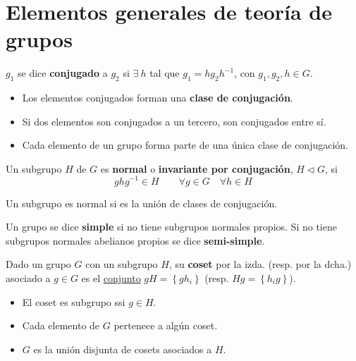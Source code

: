 \section{Elementos generales de teoría de grupos}

\begin{definicion}
$g_1$ se dice \textbf{conjugado} a $g_2$ si $\exists\ h$ tal que $g_1=hg_2h^{-1}$, con $g_1,g_2,h\in G$.
\begin{itemize}
\item Los elementos conjugados forman una \textbf{clase de conjugación}.
\item Si dos elementos son conjugados a un tercero, son conjugados entre sí. 
\item Cada elemento de un grupo forma parte de una única clase de conjugación.
\end{itemize}
\end{definicion}

\begin{definicion}
Un subgrupo $H$ de $G$ es \textbf{normal} o \textbf{invariante por conjugación}, $H\triangleleft G$, si 
\begin{equation}
ghg^{-1}\in H\qquad \forall g\in G\quad \forall h\in H
\end{equation}
\end{definicion}

\begin{teorema}
Un subgrupo es normal si es la unión de clases de conjugación.
\end{teorema}


 \begin{definicion}
 Un grupo se dice \textbf{simple} si no tiene subgrupos normales propios. Si no tiene subgrupos normales abelianos propios se dice \textbf{semi-simple}.
 \end{definicion}

\begin{definicion}
Dado un grupo $G$ con un subgrupo $H$, su \textbf{coset} por la izda. (resp. por la dcha.) asociado a $g\in  G$ es el \underline{conjunto} $gH=\left\{gh_i\right\}$ (resp. $Hg=\left\{h_i g\right\}$). 
\begin{itemize}
\item El coset es subgrupo ssi $g\in H$. 
\item Cada elemento de $G$ pertenece a algún coset. 
\item $G$ es la unión disjunta de cosets asociados a $H$.
\end{itemize}
\end{definicion}

